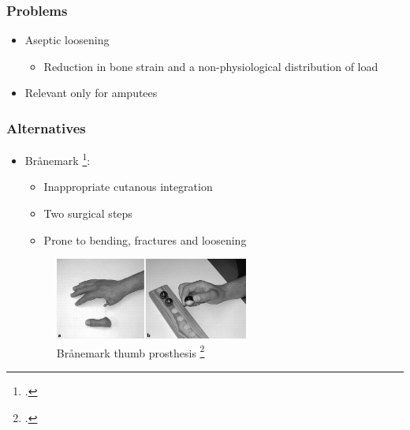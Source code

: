 \begin{frame}
    \frametitle{Problems}

    \begin{itemize}
        \item Aseptic loosening \begin{itemize}
            \item Reduction in bone strain and a non-physiological distribution of load
        \end{itemize}
        \item Relevant only for amputees
    \end{itemize}

\end{frame}

\begin{frame}
    \frametitle{Alternatives}

    \begin{itemize}
        \item Brånemark \footcite{KANG20101130}: \begin{itemize}
            \item Inappropriate cutanous integration
            \item Two surgical steps
            \item Prone to bending, fractures and loosening
        \end{itemize}
        \begin{figure}[h]
        \centering
            \includegraphics[width=0.6\textwidth]{figures/branemark-thumb.png}
        \caption{{ Brånemark thumb prosthesis \footcite{Li2017Branemark} }}
        \end{figure}
    \end{itemize}

\end{frame}